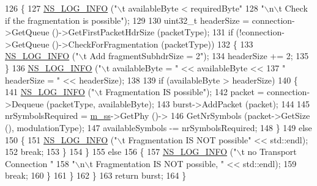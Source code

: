 \begin{DoxyCode}
126             \{
127               \hyperlink{group__logging_gafbd73ee2cf9f26b319f49086d8e860fb}{NS\_LOG\_INFO} (\textcolor{stringliteral}{"\(\backslash\)t availableByte < requiredByte"}
128                            \textcolor{stringliteral}{"\(\backslash\)n\(\backslash\)t Check if the fragmentation is possible"});
129 
130               uint32\_t headerSize = connection->GetQueue ()->GetFirstPacketHdrSize (packetType);
131               \textcolor{keywordflow}{if} (!connection->GetQueue ()->CheckForFragmentation (packetType))
132                 \{
133                   \hyperlink{group__logging_gafbd73ee2cf9f26b319f49086d8e860fb}{NS\_LOG\_INFO} (\textcolor{stringliteral}{"\(\backslash\)t Add fragmentSubhdrSize = 2"});
134                   headerSize += 2;
135                 \}
136               \hyperlink{group__logging_gafbd73ee2cf9f26b319f49086d8e860fb}{NS\_LOG\_INFO} (\textcolor{stringliteral}{"\(\backslash\)t availableByte = "} << availableByte <<
137                            \textcolor{stringliteral}{" headerSize = "} << headerSize);
138 
139               \textcolor{keywordflow}{if} (availableByte > headerSize)
140                 \{
141                   \hyperlink{group__logging_gafbd73ee2cf9f26b319f49086d8e860fb}{NS\_LOG\_INFO} (\textcolor{stringliteral}{"\(\backslash\)t Fragmentation IS possible"});
142                   packet = connection->Dequeue (packetType, availableByte);
143                   burst->AddPacket (packet);
144 
145                   nrSymbolsRequired = \hyperlink{classns3_1_1SSScheduler_a9a0b3cae20f18593e3d150e7534ce678}{m\_ss}->GetPhy ()->
146                     GetNrSymbols (packet->GetSize (), modulationType);
147                   availableSymbols -= nrSymbolsRequired;
148                 \}
149               \textcolor{keywordflow}{else}
150                 \{
151                   \hyperlink{group__logging_gafbd73ee2cf9f26b319f49086d8e860fb}{NS\_LOG\_INFO} (\textcolor{stringliteral}{"\(\backslash\)t Fragmentation IS NOT possible"} << std::endl);
152                   \textcolor{keywordflow}{break};
153                 \}
154             \}
155           \textcolor{keywordflow}{else}
156             \{
157               \hyperlink{group__logging_gafbd73ee2cf9f26b319f49086d8e860fb}{NS\_LOG\_INFO} (\textcolor{stringliteral}{"\(\backslash\)t no Transport Connection "}
158                            \textcolor{stringliteral}{"\(\backslash\)n\(\backslash\)t Fragmentation IS NOT possible, "} << std::endl);
159               \textcolor{keywordflow}{break};
160             \}
161         \}
162     \}
163   \textcolor{keywordflow}{return} burst;
164 \}
\end{DoxyCode}


